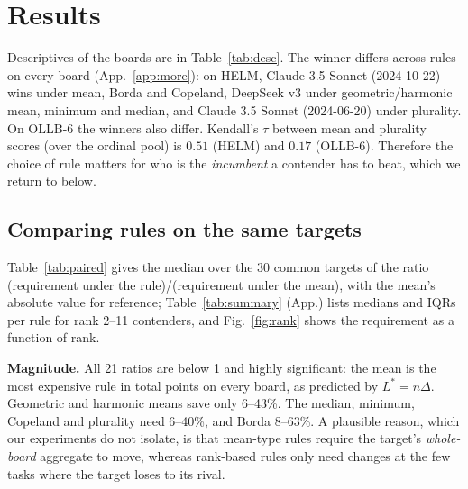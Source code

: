 \documentclass{article}
\theoremstyle{remark}
\begin{document}
\section{Results}\label{sec:results}
Descriptives of the boards are in Table~\ref{tab:desc}. The winner differs across rules on every board (App.~\ref{app:more}): on HELM, Claude 3.5 Sonnet (2024-10-22) wins under mean, Borda and Copeland, DeepSeek v3 under geometric/harmonic mean, minimum and median, and Claude 3.5 Sonnet (2024-06-20) under plurality. On OLLB-6 the winners also differ. Kendall's $\tau$ between mean and plurality scores (over the ordinal pool) is $0.51$ (HELM) and $0.17$ (OLLB-6). Therefore the choice of rule matters for who is the \emph{incumbent} a contender has to beat, which we return to below.

\begin{table}[t]
\centering\small
\caption{Boards. ``Ordinal pool'' is the number of models used for ordinal rules; ``Add.\ resid.\ SD'' is the residual SD (points) of a two-way additive fit (model + task), i.e.\ the task-specific variation that is not a model-wide skill effect.}\label{tab:desc}

\end{table}

\subsection{Comparing rules on the same targets}
Table~\ref{tab:paired} gives the median over the 30 common targets of the ratio (requirement under the rule)/(requirement under the mean), with the mean's absolute value for reference; Table~\ref{tab:summary} (App.) lists medians and IQRs per rule for rank 2--11 contenders, and Fig.~\ref{fig:rank} shows the requirement as a function of rank.

\begin{table}[t]
\centering\small
\caption{Paired comparison on 30 common targets (ranks 2--31 by mean). Entries: median ratio of the requirement under the rule to that under the arithmetic mean ($<1$: easier than the mean). Cap $g{=}100$ for $L^\ast,K^\ast$. $^\dagger$: not significant after Holm correction (Wilcoxon, $\alpha=0.05$); all other entries have $p_{\rm Holm}<0.05$. CIs, shares and $p$-values in App.~\ref{app:more}, Table~\ref{tab:pairedfull}.}\label{tab:paired}
\resizebox{\textwidth}{!}{}
\end{table}

\textbf{Magnitude.} All 21 ratios are below 1 and highly significant: the mean is the most expensive rule in total points on every board, as predicted by $L^\ast=n\Delta$. Geometric and harmonic means save only 6--43\%. The median, minimum, Copeland and plurality need 6--40\%, and Borda 8--63\%. A plausible reason, which our experiments do not isolate, is that mean-type rules require the target's \emph{whole-board} aggregate to move, whereas rank-based rules only need changes at the few tasks where the target loses to its rival.
\end{document}
